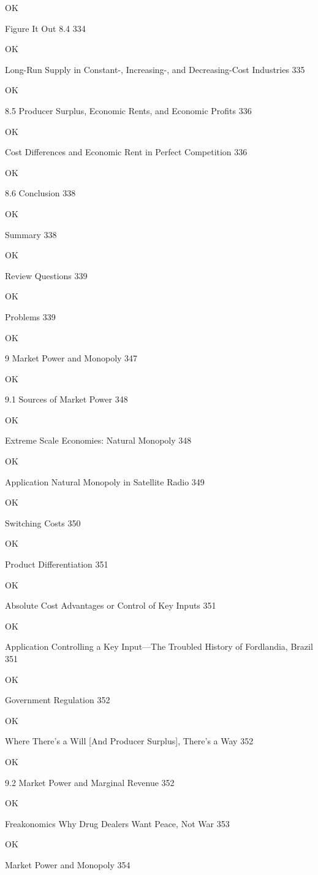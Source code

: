 OK

Figure It Out 8.4 334

OK

Long-Run Supply in Constant-, Increasing-, and Decreasing-Cost Industries 335

OK

8.5 Producer Surplus, Economic Rents, and Economic Profits 336

OK

Cost Differences and Economic Rent in Perfect Competition 336

OK

8.6 Conclusion 338

OK

Summary 338

OK

Review Questions 339

OK

Problems 339

OK

9 Market Power and Monopoly 347

OK

9.1 Sources of Market Power 348

OK

Extreme Scale Economies: Natural Monopoly 348

OK

Application Natural Monopoly in Satellite Radio 349

OK

Switching Costs 350

OK

Product Differentiation 351

OK

Absolute Cost Advantages or Control of Key Inputs 351

OK

Application Controlling a Key Input—The Troubled History of Fordlandia, Brazil 351

OK

Government Regulation 352

OK

Where There's a Will [And Producer Surplus], There's a Way 352

OK

9.2 Market Power and Marginal Revenue 352

OK

Freakonomics Why Drug Dealers Want Peace, Not War 353

OK

Market Power and Monopoly 354

